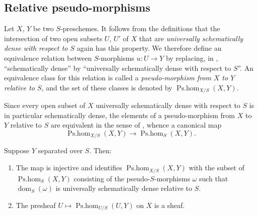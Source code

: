 \subsection{Relative pseudo-morphisms}

\begin{env}[20.5.1]\label{IV.20.5.1}
Let $X$, $Y$ be two $S$-preschemes.
It follows from the definitions  that the intersection of two open subsets $U$, $U'$ of $X$ that are \emph{universally schematically dense with respect to $S$} again has this property.
We therefore define an equivalence relation between $S$-morphisms $u:U\to Y$ by replacing, in , ``schematically dense'' by ``universally schematically dense with respect to $S$''.
An equivalence class for this relation is called a \emph{pseudo-morphism from $X$ to $Y$ relative to $S$}, and the set of these classes is denoted by $\operatorname{Ps.hom}_{X/S}(X,Y)$.
\end{env}

\begin{env}[20.5.2]
\label{IV.20.5.2}
Since every open subset of $X$ universally schematically dense with respect to $S$ is in particular schematically dense, the elements of a pseudo-morphism
from $X$ to $Y$ relative to $S$ are equivalent in the sense of , whence a canonical map
\[
\label{IV.20.5.2.1}
  \operatorname{Ps.hom}_{X/S}(X,Y)\to\operatorname{Ps.hom}_S(X,Y).
  \tag{20.5.2.1}
\]
\end{env}

\begin{proposition}[20.5.3]
\label{IV.20.5.3}
Suppose $Y$ separated over $S$.
Then:
\begin{enumerate}[label=\emph{(\roman*)}]
  \item The map  is injective and identifies $\operatorname{Ps.hom}_{X/S}(X,Y)$ with the subset of $\operatorname{Ps.hom}_S(X,Y)$ consisting of the pseudo-$S$-morphisms $\omega$ such that $\operatorname{dom}_S(\omega)$ is universally schematically dense relative to $S$.
  \item The presheaf $U\mapsto\operatorname{Ps.hom}_{U/S}(U,Y)$ on $X$ is a sheaf.
\end{enumerate}
\end{proposition}

